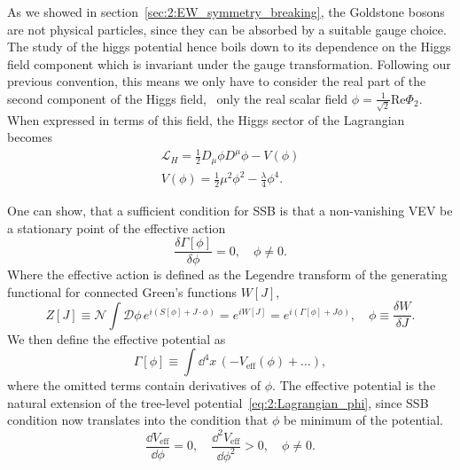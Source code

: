 As we showed in section~\ref{sec:2:EW_symmetry_breaking}, the Goldstone bosons are not physical particles, since they can be absorbed by a suitable gauge choice. The study of the higgs potential hence boils down to its dependence on the Higgs field component which is invariant under the gauge transformation. Following our previous convention, this means we only have to consider the real part of the second component of the Higgs field, \ie\ only the real scalar field $\phi = \frac{1}{\sqrt{2}} \text{Re} \Phi_2$. When expressed in terms of this field, the Higgs sector of the Lagrangian becomes
\begin{equation}
\begin{gathered}
\mathcal{L}_H = \frac{1}{2} D_\mu \phi D^\mu \phi - V(\phi) \\
V(\phi) =  \frac{1}{2} \mu^2 \phi^2 - \frac{\lambda}{4} \phi^4.
\end{gathered}
\label{eq:2:Lagrangian_phi}
\end{equation}

One can show, that a sufficient condition for \acs{SSB} is that a non-vanishing \acs{VEV} be a stationary point of the effective action
\begin{equation}
\frac{\delta \Gamma [\phi]}{\delta \phi} = 0, \quad \phi \neq 0.
\label{eq:2:SSB_condition}
\end{equation}
Where the effective action is defined as the Legendre transform of the generating functional for connected Green's functions $W[J]$, \ie
\begin{equation}
Z[J] \equiv \mathcal{N} \int \mathcal{D} \phi \, e^{i (S[\phi] + J \cdot \phi)} = e^{i W[J]} = e^{i (\Gamma[\phi] + J \phi)}, \quad \phi \equiv \frac{\delta W}{\delta J}.
\end{equation}
We then define the effective potential as
\begin{equation}
\Gamma [\phi] \equiv \int \dd^4 x\, \left(-V_{\text{eff}}(\phi) + \ldots \right),
\label{eq:2:Veff}
\end{equation}
where the omitted terms contain derivatives of $\phi$. The effective potential is the natural extension of the tree-level potential~\eqref{eq:2:Lagrangian_phi}, since \acs{SSB} condition now translates into the condition that $\phi$ be minimum of the potential.
\begin{equation}
\frac{\dd V_\text{eff}}{\dd \phi} = 0, \quad \frac{\dd^2 V_\text{eff}}{\dd \phi^2} > 0, \quad \phi \neq 0.
\end{equation}

